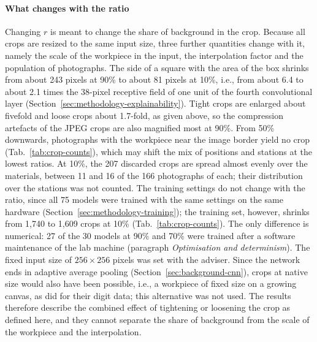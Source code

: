 \paragraph{What changes with the ratio}
\label{sec:methodology-covariates}
Changing $r$ is meant to change the share of background in the crop. Because all crops
are resized to the same input size, three further quantities change with it, namely
the scale of the workpiece in the input, the interpolation factor and the population of
photographs. The side of a square with the area of the box shrinks from about 243
pixels at 90\% to about 81 pixels at 10\%, i.e., from about 6.4 to about 2.1 times the
38-pixel receptive field of one unit of the fourth convolutional layer (Section~\ref{sec:methodology-explainability}).
Tight crops are enlarged about fivefold and loose crops about 1.7-fold, as given above,
so the compression artefacts of the JPEG crops are also magnified most at 90\%. From
50\% downwards, photographs with the workpiece near the image border yield no crop
(Tab.~\ref{tab:crop-counts}), which may shift the mix of positions and stations at the
lowest ratios. At 10\%, the 207 discarded crops are spread almost evenly over the
materials, between 11 and 16 of the 166 photographs of each; their distribution over the
stations was not counted.
The training settings do not change with the ratio, since all 75 models were trained
with the same settings on the same hardware (Section~\ref{sec:methodology-training}); the training set, however, shrinks from 1,740
to 1,609 crops at 10\% (Tab.~\ref{tab:crop-counts}). The only difference is numerical: 27 of the 30
models at 90\% and 70\% were trained after a software maintenance of the lab machine
(paragraph \emph{Optimisation and determinism}). The fixed input size of $256 \times 256$ pixels was set with the
adviser. Since the network ends in adaptive average pooling
(Section~\ref{sec:background-cnn}), crops at native size would also have been possible,
i.e., a workpiece of fixed size on a growing canvas, as \citet{pawlowski2019needles} did for their digit data; this alternative was not used. The results therefore describe
the combined effect of tightening or loosening the crop as defined here, and they cannot
separate the share of background from the scale of the workpiece and the interpolation.

